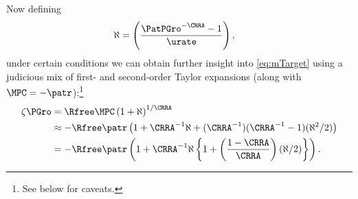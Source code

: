 \documentclass{\handout}
\begin{document}
Now defining
\begin{equation}\begin{gathered}\begin{aligned}
  \aleph & =  \left(\frac{\PatPGro^{-\CRRA} - 1}{\urate}\right),
\end{aligned}\end{gathered}\end{equation}
under certain conditions we can obtain further insight into \eqref{eq:mTarget} using a judicious mix of first- and second-order Taylor expansions (along with $\MPCU = -\patr$):\footnote{See below for caveats.}
\begin{equation}\begin{gathered}\begin{aligned}
  \label{eq:zetaExp}
  \zeta\PGro & =  \Rfree \MPCU \left(1+\aleph\right)^{1/\CRRA}
\\ & \approx  -\Rfree \patr \left(1+\CRRA^{-1}\aleph+(\CRRA^{-1})(\CRRA^{-1}-1)(\aleph^{2}/2)\right)
\\ & =  -\Rfree \patr \left(1+\CRRA^{-1}\aleph\left\{1+\left(\frac{1-\CRRA}{\CRRA}\right)(\aleph/2)\right\}\right) %
.
\end{aligned}\end{gathered}\end{equation}
\end{document}
